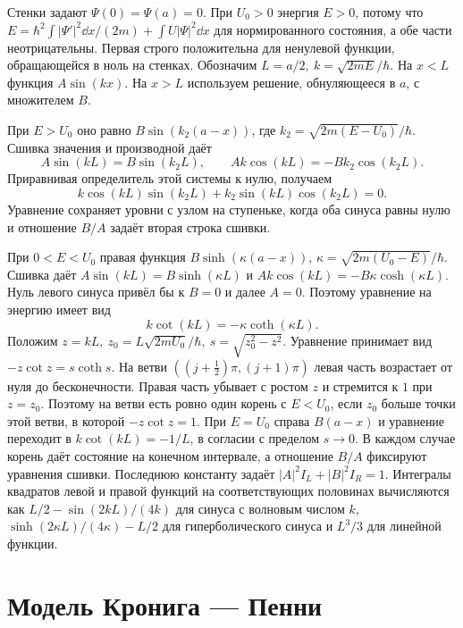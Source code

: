 \documentclass[11pt,a4paper]{article}
\begin{document}
Стенки задают \(\Psi(0)=\Psi(a)=0\). При \(U_0>0\)
энергия \(E>0\), потому что
\(E=\hbar^2\int|\Psi'|^2\dd x/(2m)+\int U|\Psi|^2\dd x\)
для нормированного состояния, а обе части неотрицательны.
Первая строго положительна для ненулевой функции, обращающейся
в ноль на стенках. Обозначим \(L=a/2,\ k=\sqrt{2mE}/\hbar\).
На \(x<L\) функция \(A\sin(kx)\). На \(x>L\) используем
решение, обнуляющееся в \(a\), с множителем \(B\).

При \(E>U_0\) оно равно \(B\sin(k_2(a-x))\), где
\(k_2=\sqrt{2m(E-U_0)}/\hbar\). Сшивка значения и производной даёт
\[
 A\sin(kL)=B\sin(k_2L),\qquad Ak\cos(kL)=-Bk_2\cos(k_2L).
\]
Приравнивая определитель этой системы к нулю, получаем
\[
 k\cos(kL)\sin(k_2L)+k_2\sin(kL)\cos(k_2L)=0.
\]
Уравнение сохраняет уровни с узлом на ступеньке, когда оба синуса
равны нулю и отношение \(B/A\) задаёт вторая строка сшивки.

При \(0<E<U_0\) правая функция \(B\sinh(\kappa(a-x))\),
\(\kappa=\sqrt{2m(U_0-E)}/\hbar\).
Сшивка даёт \(A\sin(kL)=B\sinh(\kappa L)\) и
\(Ak\cos(kL)=-B\kappa\cosh(\kappa L)\).
Нуль левого синуса привёл бы к \(B=0\) и далее \(A=0\).
Поэтому уравнение на энергию имеет вид
\[
 k\cot(kL)=-\kappa\coth(\kappa L).
\]
Положим \(z=kL,\ z_0=L\sqrt{2mU_0}/\hbar,\ s=\sqrt{z_0^2-z^2}\).
Уравнение принимает вид \(-z\cot z=s\coth s\).
На ветви \(((j+\tfrac12)\pi,(j+1)\pi)\) левая часть
возрастает от нуля до бесконечности. Правая часть убывает
с ростом \(z\) и стремится к \(1\) при \(z=z_0\).
Поэтому на ветви есть ровно один корень с \(E<U_0\), если
\(z_0\) больше точки этой ветви, в которой \(-z\cot z=1\).
При \(E=U_0\) справа \(B(a-x)\) и уравнение переходит в
\(k\cot(kL)=-1/L\), в согласии с пределом \(s\to0\).
В каждом случае корень даёт состояние на конечном интервале,
а отношение \(B/A\) фиксируют уравнения сшивки.
Последнюю константу задаёт
\(|A|^2 I_L+|B|^2 I_R=1\).
Интегралы квадратов левой и правой функций на соответствующих
половинах вычисляются как \(L/2-\sin(2kL)/(4k)\) для синуса
с волновым числом \(k\), \(\sinh(2\kappa L)/(4\kappa)-L/2\)
для гиперболического синуса и \(L^3/3\) для линейной функции.

\section{Модель Кронига --- Пенни}
\end{document}

